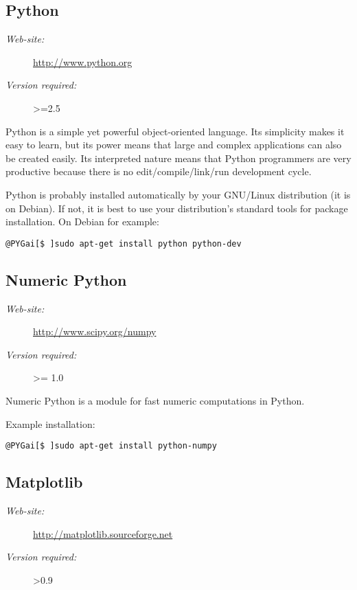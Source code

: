 \documentclass[a4paper,10pt]{manual}
\begin{document}
\subsection{Python}
\begin{description}
\item[\emph{Web-site:}]
\href{http://www.python.org}{http://www.python.org}

\item[\emph{Version required:}]
\textgreater{}=2.5

\end{description}

Python is a simple yet powerful object-oriented language. Its simplicity makes it easy to learn, but its power means that large and complex applications can also be created easily. Its interpreted nature means that Python programmers are very productive because there is no edit/compile/link/run development cycle.

Python is probably installed automatically by your GNU/Linux distribution (it is on Debian). If not, it is best to use your distribution's standard tools for package installation. On Debian for example:

\begin{Verbatim}[commandchars=@\[\]]
@PYGai[$ ]sudo apt-get install python python-dev
\end{Verbatim}


\subsection{Numeric Python}
\begin{description}
\item[\emph{Web-site:}]
\href{http://www.scipy.org/numpy}{http://www.scipy.org/numpy}

\item[\emph{Version required:}]
\textgreater{}= 1.0

\end{description}

Numeric Python is a module for fast numeric computations in Python.

Example installation:

\begin{Verbatim}[commandchars=@\[\]]
@PYGai[$ ]sudo apt-get install python-numpy
\end{Verbatim}


\subsection{Matplotlib}
\begin{description}
\item[\emph{Web-site:}]
\href{http://matplotlib.sourceforge.net}{http://matplotlib.sourceforge.net}

\item[\emph{Version required:}]
\textgreater{}0.9

\end{description}
\end{document}
